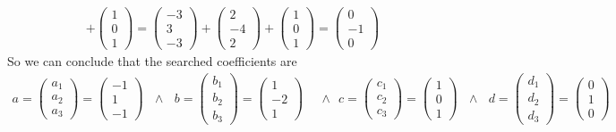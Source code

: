 \documentclass{article}
\begin{document}
\begin{align}
                + \left(\begin{matrix} 1\\0\\1 \end{matrix}\right)
                = \left(\begin{matrix} -3\\3\\-3 \end{matrix}\right) + \left(\begin{matrix} 2\\-4\\2 \end{matrix}\right)
                + \left(\begin{matrix} 1\\0\\1 \end{matrix}\right) = \left(\begin{matrix} 0\\-1\\0 \end{matrix}\right)
        \end{align}
        So we can conclude that the searched coefficients are
        \begin{align}
            a = \left(\begin{matrix} a_1\\a_2\\a_3 \end{matrix}\right) = \left(\begin{matrix} -1\\1\\-1 \end{matrix}\right)
            \ \ \ \wedge\ \ \ 
            b = \left(\begin{matrix} b_1\\b_2\\b_3 \end{matrix}\right) = \left(\begin{matrix} 1\\-2\\1 \end{matrix}\right)
            \ \ \ &\wedge\ \ \ 
            c = \left(\begin{matrix} c_1\\c_2\\c_3 \end{matrix}\right) = \left(\begin{matrix} 1\\0\\1 \end{matrix}\right)
            \ \ \ \wedge\ \ \ 
            d = \left(\begin{matrix} d_1\\d_2\\d_3 \end{matrix}\right) = \left(\begin{matrix} 0\\1\\0 \end{matrix}\right)
        \end{align}
        
\end{document}
